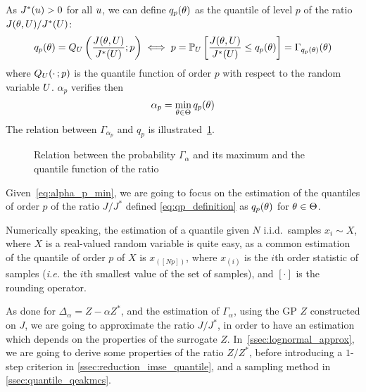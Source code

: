 \documentclass[../../Main_ManuscritThese.tex]{subfiles}
\newcommand\imgpath{/home/victor/acadwriting/Manuscrit/Text/Chapter4/img/}
\begin{document}
As $J^*(u) > 0$ for all $u$, we can define $q_{p}(\theta)$ as the quantile of level $p$ of the ratio $J(\theta, U) / J^*(U)$:
\begin{align}
  \label{eq:qp_definition}
       q_{p}(\theta)= Q_{U}\left(\frac{J(\theta, U)}{J^*(U)};p\right) \iff  p  = \mathbb{P}_{U}\left[\frac{J(\theta, U)}{J^*(U)} \leq q_{p}(\theta)\right] = \Gamma_{q_p(\theta)}(\theta)
\end{align}
where $Q_{U}(\cdot\,;p)$ is the quantile function of order $p$ with respect to the random variable $U$.
$\alpha_p$ verifies then
\begin{equation}
  \label{eq:alpha_p_min}
\alpha_p = \min_{\theta\in\Theta} q_p(\theta)
\end{equation}
The relation between $\Gamma_{\alpha_p}$ and $q_p$ is illustrated~\cref{fig:q_p_illu}.
\begin{figure}[ht]
  \centering
  
  \caption{\label{fig:q_p_illu} Relation between the probability
    $\Gamma_{\alpha}$ and its maximum and the quantile function of the
    ratio}
\end{figure}

Given~\cref{eq:alpha_p_min}, we are going to focus on the estimation
of the quantiles of order $p$ of the ratio $J/J^*$
defined \cref{eq:qp_definition} as $q_p(\theta)$ for $\theta \in \Theta$.

Numerically speaking, the estimation of a quantile given $N$ i.i.d.\
samples $x_i \sim X$, where $X$ is a real-valued random variable is
quite easy, as a common estimation of the quantile of order $p$ of $X$ is
$x_{(\left[Np\right])}$, where $x_{(i)}$ is the $i$th order statistic
of samples (\emph{i.e.} the $i$th smallest value of the set of
samples), and $[\cdot]$ is the rounding operator.

As done for $\Delta_{\alpha} = Z - \alpha Z^*$, and the estimation of
$\Gamma_{\alpha}$, using the GP $Z$ constructed on $J$, we are going
to approximate the ratio $J/J^*$, in order to have an estimation which
depends on the properties of the surrogate $Z$.
In~\cref{ssec:lognormal_approx}, we are going to derive some
properties of the ratio $Z/Z^*$, before introducing a $1$-step
criterion in \cref{ssec:reduction_imse_quantile}, and a sampling
method in \cref{ssec:quantile_qeakmcs}.
\end{document}
